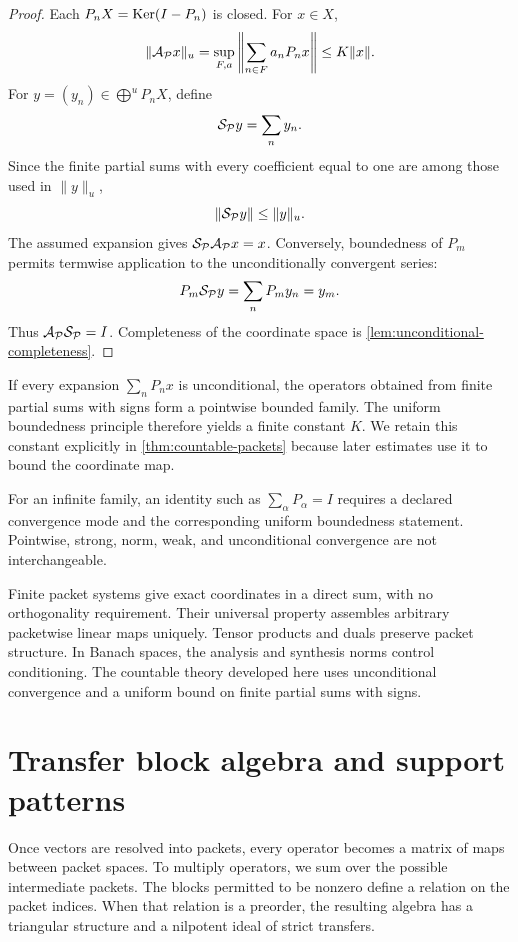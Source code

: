 \begin{proof}
Each $P_nX=\operatorname{Ker}(I-P_n)$ is closed.  For $x\in X$,
\[
\|\mathcal A_{\mathcal P}x\|_u
=
\sup_{F,a}
\left\|\sum_{n\in F}a_nP_nx\right\|
\leq K\|x\|.
\]
For $y=(y_n)\in\bigoplus^uP_nX$, define
\[
\mathcal S_{\mathcal P}y=\sum_ny_n.
\]
Since the finite partial sums with every coefficient equal to one are among those used in $\|y\|_u$,
\[
\|\mathcal S_{\mathcal P}y\|
\leq\|y\|_u.
\]
The assumed expansion gives $\mathcal S_{\mathcal P}\mathcal A_{\mathcal P}x=x$.  Conversely, boundedness of $P_m$ permits termwise application to the unconditionally convergent series:
\[
P_m\mathcal S_{\mathcal P}y
=
\sum_nP_my_n
=y_m.
\]
Thus $\mathcal A_{\mathcal P}\mathcal S_{\mathcal P}=I$.  Completeness of the coordinate space is \cref{lem:unconditional-completeness}.
\end{proof}

\begin{remark}
\label{rem:uniform-boundedness}
If every expansion $\sum_nP_nx$ is unconditional, the operators obtained from finite partial sums with signs form a pointwise bounded family.  The uniform boundedness principle therefore yields a finite constant $K$.  We retain this constant explicitly in \cref{thm:countable-packets} because later estimates use it to bound the coordinate map.
\end{remark}

\begin{boundary}
\label{bnd:infinite-packet-topology}
For an infinite family, an identity such as $\sum_\alpha P_\alpha=I$ requires a declared convergence mode and the corresponding uniform boundedness statement.  Pointwise, strong, norm, weak, and unconditional convergence are not interchangeable.
\end{boundary}

\begin{sectionrecap}
Finite packet systems give exact coordinates in a direct sum, with no orthogonality requirement.  Their universal property assembles arbitrary packetwise linear maps uniquely.  Tensor products and duals preserve packet structure.  In Banach spaces, the analysis and synthesis norms control conditioning.  The countable theory developed here uses unconditional convergence and a uniform bound on finite partial sums with signs.
\end{sectionrecap}


\section{Transfer block algebra and support patterns}
\begin{readerroadmap}
Once vectors are resolved into packets, every operator becomes a matrix of maps between packet spaces.  To multiply operators, we sum over the possible intermediate packets.  The blocks permitted to be nonzero define a relation on the packet indices.  When that relation is a preorder, the resulting algebra has a triangular structure and a nilpotent ideal of strict transfers.
\end{readerroadmap}
